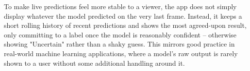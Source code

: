 \documentclass[11 pt , a 4 paper ]{article}
\theoremstyle{definition}
\begin{document}
\noindent To make live predictions feel more stable to a viewer, the app does not simply display whatever the model predicted on the very last frame. Instead, it keeps a short rolling history of recent predictions and shows the most agreed-upon result, only committing to a label once the model is reasonably confident -- otherwise showing "Uncertain" rather than a shaky guess. This mirrors good practice in real-world machine learning applications, where a model's raw output is rarely shown to a user without some additional handling around it.
\end{document}
